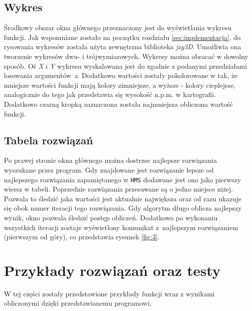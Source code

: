 \documentclass[10pt, a4paper]{article}
\begin{document}
\subsection{Wykres}
\label{subsec:wykres}
Środkowy obszar okna głównego przeznaczony jest do wyświetlania wykresu funkcji. Jak wspomniane zostało na początku rozdziału \ref{sec:implementacja}, do rysowania wykresów została użyta zewnętrzna biblioteka {\em jzy3D}. Umożliwia ona tworzenie wykresów dwu- i trójwymiarowych. Wykresy można obracać w dowolny sposób. Oś {\em X} i {\em Y} wykresu wyskalowana jest do zgodnie z podanymi przedziałami losowania argumentów~{\em x}. Dodatkowo wartości zostały pokolorowane w tak, że mniejsze wartości funkcji mają kolory zimniejsze, a wyższe - kolory cieplejsze, analogicznie do tego jak przedstawia się wysokość n.p.m. w kartografii. Dodatkowo czarną kropką zaznaczona została najmniejsza obliczona wartość funkcji. 

\subsection{Tabela rozwiązań}
\label{subsec:rozwiazania}
Po prawej stronie okna głównego można dostrzec najlepsze rozwiązania wyszukane przez program. Gdy znajdowane jest rozwiązanie lepsze od najlepszego rozwiązania zapamiętanego w {\tt HMS} dodawane jest ono jako pierwszy wiersz w tabeli. Poprzednie rozwiązania przesuwane są o jedno miejsce niżej. Pozwala to śledzić jaka wartości jest aktualnie największa oraz od razu ukazuje się obok numer iteracji tego rozwiązania. Gdy algorytm długo oblicza najlepszy wynik, okno pozwala śledzić postęp obliczeń. Dodatkowo po wykonaniu wszystkich iteracji zostaje wyświetlony komunikat z~najlepszym rozwiązaniem (pierwszym od góry), co przedstawia rysunek \ref{fig:3}.

\pagebreak

\section{Przykłady rozwiązań oraz testy}
\label{sec:przyklady}
W tej części zostały przedstawione przykłady funkcji wraz z wynikami obliczonymi dzięki przedstawianemu programowi. 
\end{document}
